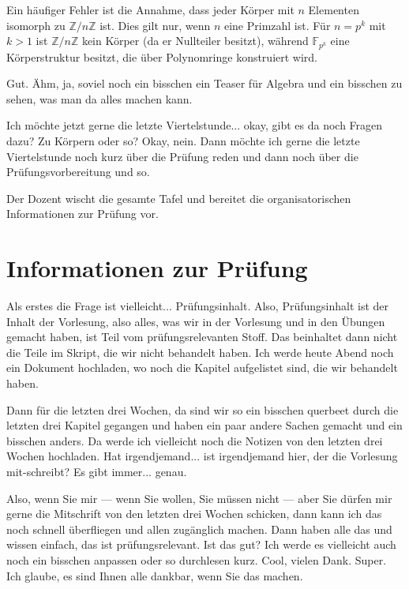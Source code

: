 \begin{didactic-insight}
Ein häufiger Fehler ist die Annahme, dass jeder Körper mit $n$ Elementen isomorph zu $\mathbb{Z}/n\mathbb{Z}$ ist. Dies gilt nur, wenn $n$ eine Primzahl ist. Für $n = p^k$ mit $k > 1$ ist $\mathbb{Z}/n\mathbb{Z}$ kein Körper (da er Nullteiler besitzt), während $\mathbb{F}_{p^k}$ eine Körperstruktur besitzt, die über Polynomringe konstruiert wird.
\end{didactic-insight}

\begin{spoken-clean}[01:04:39 - 01:06:24]
Gut. Ähm, ja, soviel noch ein bisschen ein Teaser für Algebra und ein bisschen zu sehen, was man da alles machen kann. 

Ich möchte jetzt gerne die letzte Viertelstunde... okay, gibt es da noch Fragen dazu? Zu Körpern oder so? Okay, nein. Dann möchte ich gerne die letzte Viertelstunde noch kurz über die Prüfung reden und dann noch über die Prüfungsvorbereitung und so.
\end{spoken-clean}

\begin{meta-note}[Tafelübergang]
Der Dozent wischt die gesamte Tafel und bereitet die organisatorischen Informationen zur Prüfung vor.
\end{meta-note}

\section{Informationen zur Prüfung}

\begin{spoken-clean}[01:06:24 - 01:08:54]
Als erstes die Frage ist vielleicht... Prüfungsinhalt. Also, Prüfungsinhalt ist der Inhalt der Vorlesung, also alles, was wir in der Vorlesung und in den Übungen gemacht haben, ist Teil vom prüfungsrelevanten Stoff. Das beinhaltet dann nicht die Teile im Skript, die wir nicht behandelt haben. Ich werde heute Abend noch ein Dokument hochladen, wo noch die Kapitel aufgelistet sind, die wir behandelt haben. 

Dann für die letzten drei Wochen, da sind wir so ein bisschen querbeet durch die letzten drei Kapitel gegangen und haben ein paar andere Sachen gemacht und ein bisschen anders. Da werde ich vielleicht noch die Notizen von den letzten drei Wochen hochladen. Hat irgendjemand... ist irgendjemand hier, der die Vorlesung mit-schreibt? Es gibt immer... genau. 

Also, wenn Sie mir --- wenn Sie wollen, Sie müssen nicht --- aber Sie dürfen mir gerne die Mitschrift von den letzten drei Wochen schicken, dann kann ich das noch schnell überfliegen und allen zugänglich machen. Dann haben alle das und wissen einfach, das ist prüfungsrelevant. Ist das gut? Ich werde es vielleicht auch noch ein bisschen anpassen oder so durchlesen kurz. Cool, vielen Dank. Super. Ich glaube, es sind Ihnen alle dankbar, wenn Sie das machen.
\end{spoken-clean}

